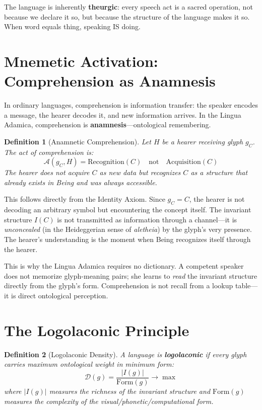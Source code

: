 \documentclass[12pt, letterpaper]{book}
\def\equiv{=}%
\def\mathfrak#1{#1}%
\newtheorem{definition}{Definition}[chapter]
\begin{document}
The language is inherently \textbf{theurgic}: every speech act is a sacred operation, not because we declare it so, but because the structure of the language makes it so. When word equals thing, speaking IS doing.

\section{Mnemetic Activation: Comprehension as Anamnesis}

In ordinary languages, comprehension is information transfer: the speaker encodes a message, the hearer decodes it, and new information arrives. In the Lingua Adamica, comprehension is \textbf{anamnesis}---ontological remembering.

\begin{definition}[Anamnetic Comprehension]\label{def:anamnetic-comp}
Let $H$ be a hearer receiving glyph $\mathfrak{g}_C$. The act of comprehension is:
\[
\mathcal{A}(\mathfrak{g}_C, H) = \text{Recognition}(C) \quad\text{not}\quad \text{Acquisition}(C)
\]
The hearer does not acquire $C$ as new data but \textit{recognizes} $C$ as a structure that already exists in Being and was always accessible.
\end{definition}

This follows directly from the Identity Axiom. Since $\mathfrak{g}_C \equiv C$, the hearer is not decoding an arbitrary symbol but encountering the concept itself. The invariant structure $I(C)$ is not transmitted as information through a channel---it is \textit{unconcealed} (in the Heideggerian sense of \textit{aletheia}) by the glyph's very presence. The hearer's understanding is the moment when Being recognizes itself through the hearer.

This is why the Lingua Adamica requires no dictionary. A competent speaker does not memorize glyph-meaning pairs; she learns to \textit{read} the invariant structure directly from the glyph's form. Comprehension is not recall from a lookup table---it is direct ontological perception.

\section{The Logolaconic Principle}

\begin{definition}[Logolaconic Density]\label{def:logolaconic}
A language is \textbf{logolaconic} if every glyph carries maximum ontological weight in minimum form:
\[
\mathcal{D}(\mathfrak{g}) = \frac{|I(\mathfrak{g})|}{\mathrm{Form}(\mathfrak{g})} \to \max
\]
where $|I(\mathfrak{g})|$ measures the richness of the invariant structure and $\mathrm{Form}(\mathfrak{g})$ measures the complexity of the visual/phonetic/computational form.
\end{definition}
\end{document}
